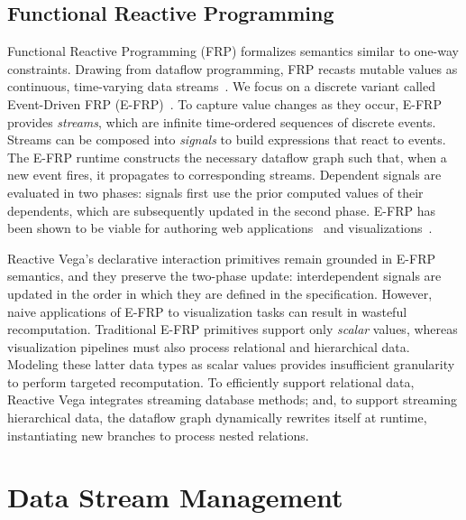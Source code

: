 \vspace{-10pt}

\subsection{Functional Reactive Programming}

\vspace{-7pt}

Functional Reactive Programming (FRP) formalizes semantics similar to one-way
constraints. Drawing from dataflow programming, FRP recasts mutable values as
continuous, time-varying data streams~\cite{bainomugisha:frpsurvey}. We focus on
a discrete variant called Event-Driven FRP (E-FRP)~\cite{wan:efrp}. To capture
value changes as they occur, E-FRP provides \emph{streams}, which are infinite
time-ordered sequences of discrete events. Streams can be composed into
\emph{signals} to build expressions that react to events. The E-FRP runtime
constructs the necessary dataflow graph such that, when a new event fires, it
propagates to corresponding streams. Dependent signals are evaluated in two
phases: signals first use the prior computed values of their dependents, which
are subsequently updated in the second phase. E-FRP has been shown to be viable
for authoring web applications~\cite{czaplicki:elm, meyerovich:flapjax} and
visualizations~\cite{cottam:stencil, kelleher:modeljs}.

Reactive Vega's declarative interaction primitives remain grounded in E-FRP
semantics, and they preserve the two-phase update: interdependent signals are
updated in the order in which they are defined in the specification. However,
naive applications of E-FRP to visualization tasks can result in wasteful
recomputation. Traditional E-FRP primitives support only \emph{scalar} values,
whereas visualization pipelines must also process relational and hierarchical
data. Modeling these latter data types as scalar values provides insufficient
granularity to perform targeted recomputation. To efficiently support relational
data, Reactive Vega integrates streaming database methods; and, to support
streaming hierarchical data, the dataflow graph dynamically rewrites itself at
runtime, instantiating new branches to process nested relations.

\vspace{-10pt}

\section{Data Stream Management}

